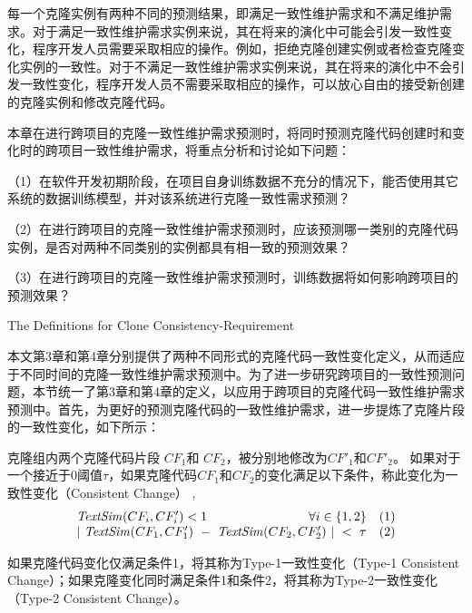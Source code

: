 每一个克隆实例有两种不同的预测结果，即满足一致性维护需求和不满足维护需求。对于满足一致性维护需求实例来说，其在将来的演化中可能会引发一致性变化，程序开发人员需要采取相应的操作。例如，拒绝克隆创建实例或者检查克隆变化实例的一致性。对于不满足一致性维护需求实例来说，其在将来的演化中不会引发一致性变化，程序开发人员不需要采取相应的操作，可以放心自由的接受新创建的克隆实例和修改克隆代码。

本章在进行跨项目的克隆一致性维护需求预测时，将同时预测克隆代码创建时和变化时的跨项目一致性维护需求，将重点分析和讨论如下问题：

（1）在软件开发初期阶段，在项目自身训练数据不充分的情况下，能否使用其它系统的数据训练模型，并对该系统进行克隆一致性需求预测？

（2）在进行跨项目的克隆一致性维护需求预测时，应该预测哪一类别的克隆代码实例，是否对两种不同类别的实例都具有相一致的预测效果？

（3）在进行跨项目的克隆一致性维护需求预测时，训练数据将如何影响跨项目的预测效果？%

{The Definitions for Clone Consistency-Requirement}

本文第3章和第4章分别提供了两种不同形式的克隆代码一致性变化定义，从而适应于不同时间的克隆一致性维护需求预测中。为了进一步研究跨项目的一致性预测问题，本节统一了第3章和第4章的定义，以应用于跨项目的克隆代码一致性维护需求预测中。首先，为更好的预测克隆代码的一致性维护需求，进一步提炼了克隆片段的一致性变化，如下所示：

\begin{definition}[克隆片段的一致性变化]  
\label{def-change}
克隆组内两个克隆代码片段 $CF_1$和 $CF_2$，被分别地修改为$CF'_1$和$CF'_2$。 如果对于一个接近于0阈值$\tau$，如果克隆代码$CF_1$和$CF_2$的变化满足以下条件，称此变化为一致性变化（Consistent Change） , 
\begin{equation}
\begin{split}
\begin{array}[t]{crl}
 \mathit{TextSim}(CF_i, CF'_i) < 1 & \forall i \in \{1,2\} &(1) \\
 \multicolumn{2}{c}{| ~\mathit{TextSim}(CF_1,CF'_1)  ~-~ \mathit{TextSim}(CF_2,CF'_2) ~| ~< ~ \tau}  & (2)
\end{array}
\end{split}
\end{equation}

如果克隆代码变化仅满足条件1，将其称为Type-1一致性变化（Type-1 Consistent Change）；如果克隆变化同时满足条件1和条件2，将其称为Type-2一致性变化（Type-2 Consistent Change）。
\end{definition}

